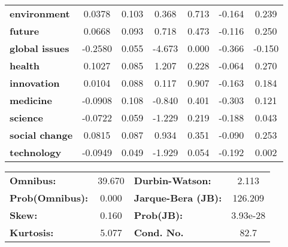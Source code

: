 \documentclass{report}
\begin{document}
\begin{center}
\begin{tabular}{lcccccc}
\textbf{environment}   &       0.0378  &        0.103     &     0.368  &         0.713        &       -0.164    &        0.239     \\
\textbf{future}        &       0.0668  &        0.093     &     0.718  &         0.473        &       -0.116    &        0.250     \\
\textbf{global issues} &      -0.2580  &        0.055     &    -4.673  &         0.000        &       -0.366    &       -0.150     \\
\textbf{health}        &       0.1027  &        0.085     &     1.207  &         0.228        &       -0.064    &        0.270     \\
\textbf{innovation}    &       0.0104  &        0.088     &     0.117  &         0.907        &       -0.163    &        0.184     \\
\textbf{medicine}      &      -0.0908  &        0.108     &    -0.840  &         0.401        &       -0.303    &        0.121     \\
\textbf{science}       &      -0.0722  &        0.059     &    -1.229  &         0.219        &       -0.188    &        0.043     \\
\textbf{social change} &       0.0815  &        0.087     &     0.934  &         0.351        &       -0.090    &        0.253     \\
\textbf{technology}    &      -0.0949  &        0.049     &    -1.929  &         0.054        &       -0.192    &        0.002     \\
\bottomrule
\end{tabular}
\begin{tabular}{lclc}
\textbf{Omnibus:}       & 39.670 & \textbf{  Durbin-Watson:     } &    2.113  \\
\textbf{Prob(Omnibus):} &  0.000 & \textbf{  Jarque-Bera (JB):  } &  126.209  \\
\textbf{Skew:}          &  0.160 & \textbf{  Prob(JB):          } & 3.93e-28  \\
\textbf{Kurtosis:}      &  5.077 & \textbf{  Cond. No.          } &     82.7  \\
\bottomrule
\end{tabular}
\end{center}
\end{document}
